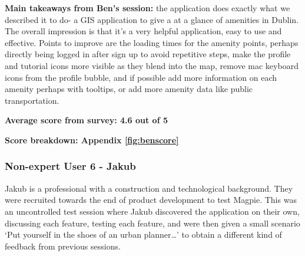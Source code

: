 \noindent\textbf{Main takeaways from Ben's session: }the application does
exactly what we described it to do- a GIS application to give a at a glance of
amenities in Dublin. The overall impression is that it's a very helpful
application, easy to use and effective. Points to improve are the loading times
for the amenity points, perhaps directly being logged in after sign up to avoid
repetitive steps, make the profile and tutorial icons more visible as they blend
into the map, remove mac keyboard icons from the profile bubble, and if possible
add more information on each amenity perhaps with tooltips, or add more amenity
data like public transportation.

\textbf{Average score from survey: 4.6 out of 5}

\textbf{Score breakdown: Appendix \ref{fig:benscore}}

\newpage{}

\subsubsection{Non-expert User 6 - Jakub}
Jakub is a professional with a construction and technological background. They
were recruited towards the end of product development to test Magpie. This was
an uncontrolled test session where Jakub discovered the application on their
own, discussing each feature, testing each feature, and were then given a small
scenario `Put yourself in the shoes of an urban planner\ldots' to obtain a
different kind of feedback from previous sessions.

